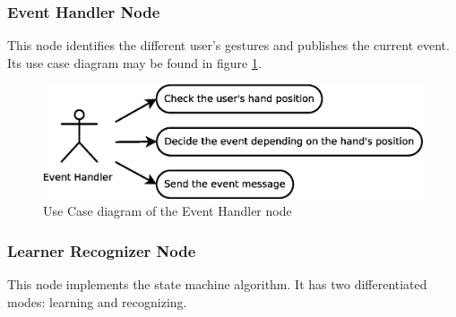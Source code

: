 

\subsubsection{Event Handler Node}
	This node identifies the different user's gestures and publishes the current event.
	Its use case diagram may be found in figure \ref{uc_event}. 

	\begin{figure}[H]
\begin{center}
		\includegraphics[scale=0.4]{img/diagrams/uc_event_handler.eps}

	\end{center}
	\caption[Use case diagram Event Handler node]{Use Case diagram of the Event Handler node}
		\label{uc_event}
\end{figure}
	
	
\subsubsection{Learner Recognizer Node}

\hspace{0.5cm}This node implements the state machine algorithm. It has two differentiated modes: learning and recognizing. 

